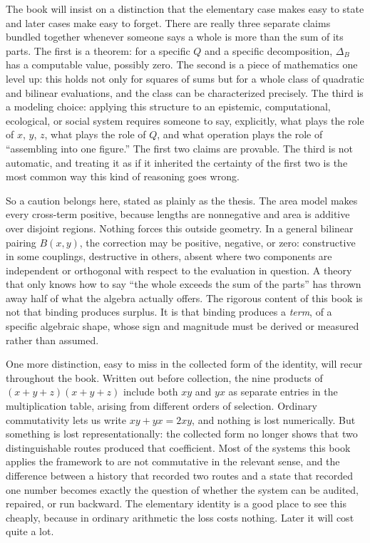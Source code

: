 \documentclass[11pt]{book}
\begin{document}
The book will insist on a distinction that the elementary case makes easy to state and later cases make easy to forget. There are really three separate claims bundled together whenever someone says a whole is more than the sum of its parts. The first is a theorem: for a specific $Q$ and a specific decomposition, $\Delta_B$ has a computable value, possibly zero. The second is a piece of mathematics one level up: this holds not only for squares of sums but for a whole class of quadratic and bilinear evaluations, and the class can be characterized precisely. The third is a modeling choice: applying this structure to an epistemic, computational, ecological, or social system requires someone to say, explicitly, what plays the role of $x$, $y$, $z$, what plays the role of $Q$, and what operation plays the role of ``assembling into one figure.'' The first two claims are provable. The third is not automatic, and treating it as if it inherited the certainty of the first two is the most common way this kind of reasoning goes wrong.

So a caution belongs here, stated as plainly as the thesis. The area model makes every cross-term positive, because lengths are nonnegative and area is additive over disjoint regions. Nothing forces this outside geometry. In a general bilinear pairing $B(x,y)$, the correction may be positive, negative, or zero: constructive in some couplings, destructive in others, absent where two components are independent or orthogonal with respect to the evaluation in question. A theory that only knows how to say ``the whole exceeds the sum of the parts'' has thrown away half of what the algebra actually offers. The rigorous content of this book is not that binding produces surplus. It is that binding produces a \emph{term}, of a specific algebraic shape, whose sign and magnitude must be derived or measured rather than assumed.

One more distinction, easy to miss in the collected form of the identity, will recur throughout the book. Written out before collection, the nine products of $(x+y+z)(x+y+z)$ include both $xy$ and $yx$ as separate entries in the multiplication table, arising from different orders of selection. Ordinary commutativity lets us write $xy+yx=2xy$, and nothing is lost numerically. But something is lost representationally: the collected form no longer shows that two distinguishable routes produced that coefficient. Most of the systems this book applies the framework to are not commutative in the relevant sense, and the difference between a history that recorded two routes and a state that recorded one number becomes exactly the question of whether the system can be audited, repaired, or run backward. The elementary identity is a good place to see this cheaply, because in ordinary arithmetic the loss costs nothing. Later it will cost quite a lot.
\end{document}

